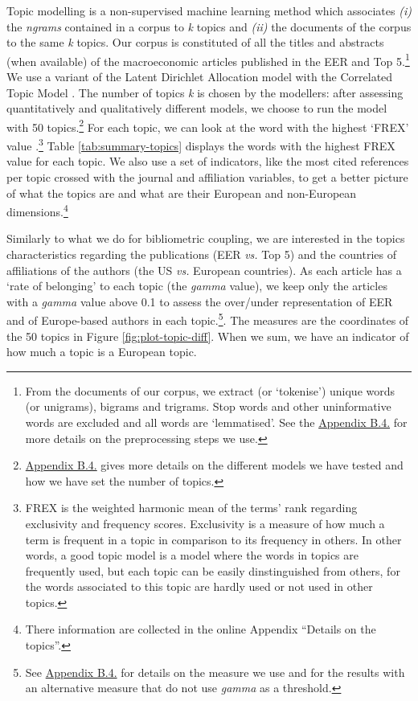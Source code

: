\documentclass[]{elsarticle} %
\begin{document}
Topic modelling is a non-supervised machine learning method which
associates \emph{(i)} the \emph{ngrams} contained in a corpus to
\emph{k} topics and \emph{(ii)} the documents of the corpus to the same
\emph{k} topics. Our corpus is constituted of all the titles and
abstracts (when available) of the macroeconomic articles published in
the EER and Top 5.\footnote{From the documents of our corpus, we extract
  (or `tokenise') unique words (or unigrams), bigrams and trigrams. Stop
  words and other uninformative words are excluded and all words are
  `lemmatised'. See the \protect\hyperlink{topic}{Appendix B.4.} for
  more details on the preprocessing steps we use.} We use a variant of
the Latent Dirichlet Allocation model with the Correlated Topic Model
\citep{blei2007}. The number of topics \emph{k} is chosen by the
modellers: after assessing quantitatively and qualitatively different
models, we choose to run the model with 50 topics.\footnote{\protect\hyperlink{topic}{Appendix
  B.4.} gives more details on the different models we have tested and
  how we have set the number of topics.} For each topic, we can look at
the word with the highest `FREX' value \citep{bischof2012}.\footnote{FREX
  is the weighted harmonic mean of the terms' rank regarding exclusivity
  and frequency scores. Exclusivity is a measure of how much a term is
  frequent in a topic in comparison to its frequency in others. In other
  words, a good topic model is a model where the words in topics are
  frequently used, but each topic can be easily dinstinguished from
  others, for the words associated to this topic are hardly used or not
  used in other topics.} Table \ref{tab:summary-topics} displays the
words with the highest FREX value for each topic. We also use a set of
indicators, like the most cited references per topic crossed with the
journal and affiliation variables, to get a better picture of what the
topics are and what are their European and non-European
dimensions.\footnote{There information are collected in the online
  Appendix ``Details on the topics''.}

Similarly to what we do for bibliometric coupling, we are interested in
the topics characteristics regarding the publications (EER \emph{vs.}
Top 5) and the countries of affiliations of the authors (the US
\emph{vs.} European countries). As each article has a `rate of
belonging' to each topic (the \emph{gamma} value), we keep only the
articles with a \emph{gamma} value above 0.1 to assess the over/under
representation of EER and of Europe-based authors in each
topic.\footnote{See \protect\hyperlink{topic}{Appendix B.4.} for details
  on the measure we use and for the results with an alternative measure
  that do not use \emph{gamma} as a threshold.}. The measures are the
coordinates of the 50 topics in Figure \ref{fig:plot-topic-diff}. When
we sum, we have an indicator of how much a topic is a European topic.
\end{document}
